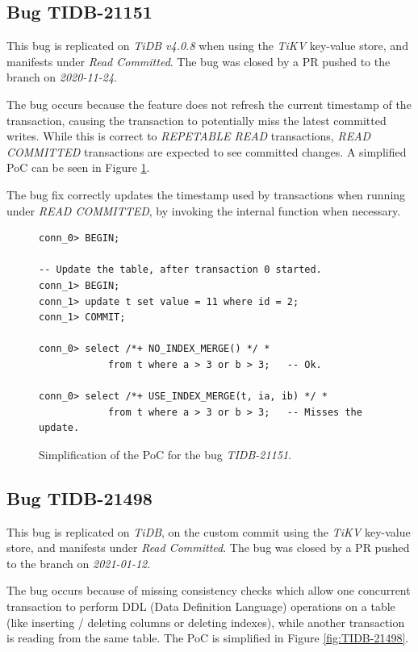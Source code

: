 \subsection*{Bug TIDB-21151}

This bug is replicated on \textit{TiDB v4.0.8} when using the \textit{TiKV} key-value store, and manifests under \textit{Read Committed}. The bug was closed by a PR pushed to the  branch on \textit{2020-11-24}.

The bug occurs because the  feature does not refresh the current timestamp of the transaction, causing the transaction to potentially miss the latest committed writes. While this is correct to \textit{REPETABLE READ} transactions, \textit{READ COMMITTED} transactions are expected to see committed changes. A simplified PoC can be seen in Figure \ref{fig:TIDB-21151}. 

The bug fix correctly updates the timestamp used by transactions when running under \textit{READ COMMITTED}, by invoking the  internal function when necessary.

\begin{figure}
\begin{verbatim}
conn_0> BEGIN;

-- Update the table, after transaction 0 started.
conn_1> BEGIN;
conn_1> update t set value = 11 where id = 2;
conn_1> COMMIT;

conn_0> select /*+ NO_INDEX_MERGE() */ *
            from t where a > 3 or b > 3;   -- Ok.

conn_0> select /*+ USE_INDEX_MERGE(t, ia, ib) */ *
            from t where a > 3 or b > 3;   -- Misses the update.
\end{verbatim}
\caption{Simplification of the PoC for the bug \textit{TIDB-21151}.} \label{fig:TIDB-21151}
\end{figure}

\subsection*{Bug TIDB-21498}

This bug is replicated on \textit{TiDB}, on the custom commit  using the \textit{TiKV} key-value store, and manifests under \textit{Read Committed}. The bug was closed by a PR pushed to the  branch on \textit{2021-01-12}.

The bug occurs because of missing consistency checks which allow one concurrent transaction to perform DDL (Data Definition Language) operations on a table (like inserting / deleting columns or deleting indexes), while another transaction is reading from the same table. The PoC is simplified in Figure \ref{fig:TIDB-21498}.


